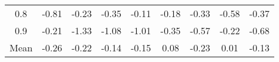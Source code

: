 \begin{longtable}{ | c || c | c | c | c | c | c | c || c |}
0.8 &  \cellcolor[HTML]{FFE7E7} -0.81 &  \cellcolor[HTML]{FFF7F7} -0.23 &  \cellcolor[HTML]{FFF7F7} -0.35 &  \cellcolor[HTML]{FFFFFF} -0.11 &  \cellcolor[HTML]{FFF7F7} -0.18 &  \cellcolor[HTML]{FFF7F7} -0.33 &  \cellcolor[HTML]{FFEFEF} -0.58 &  \cellcolor[HTML]{FFF7F7} -0.37 \\
0.9 &  \cellcolor[HTML]{FFF7F7} -0.21 &  \cellcolor[HTML]{FFDFDF} -1.33 &  \cellcolor[HTML]{FFE7E7} -1.08 &  \cellcolor[HTML]{FFE7E7} -1.01 &  \cellcolor[HTML]{FFF7F7} -0.35 &  \cellcolor[HTML]{FFEFEF} -0.57 &  \cellcolor[HTML]{FFF7F7} -0.22 &  \cellcolor[HTML]{FFEFEF} -0.68 \\
\hline
\hline
Mean  &  \cellcolor[HTML]{FFF7F7} -0.26 &  \cellcolor[HTML]{FFF7F7} -0.22 &  \cellcolor[HTML]{FFFFFF} -0.14 &  \cellcolor[HTML]{FFFFFF} -0.15 &  \cellcolor[HTML]{FFFFFF} 0.08 &  \cellcolor[HTML]{FFF7F7} -0.23 &  \cellcolor[HTML]{FFFFFF} 0.01 &  \cellcolor[HTML]{FFFFFF} -0.13 \\
\hline
\end{longtable}
